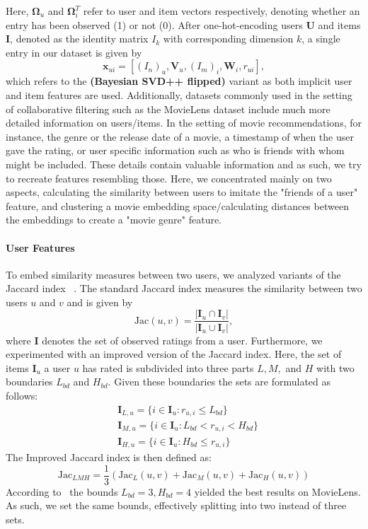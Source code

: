 \documentclass[10pt,conference,compsocconf]{IEEEtran}
\begin{document}
    Here, $\mathbf{\Omega}_u$ and $\mathbf{\Omega}^T_i$ refer to user and item vectors respectively, denoting whether an entry has been observed (1) or not (0).
    After one-hot-encoding users $\mathbf{U}$ and items $\mathbf{I}$, denoted as the identity matrix $I_k$ with corresponding dimension $k$, a single entry in our dataset is given by
    $$\mathbf{x}_{ui} = [(I_n)_u,\mathbf{V}_u,(I_m)_i,\mathbf{W}_i, r_{ui}],$$
    which refers to the \textbf{(Bayesian SVD++ flipped)} variant as both implicit user and item features are used.
    Additionally, datasets commonly used in the setting of collaborative filtering such as the MovieLens dataset include much more detailed information on users/items.
    In the setting of movie recommendations, for instance, the genre or the release date of a movie, a timestamp of when the user gave the rating, or user specific information such as who is friends with whom might be included.
    These details contain valuable information and as such, we try to recreate features resembling those.
    Here, we concentrated mainly on two aspects, calculating the similarity between users to imitate the "friends of a user" feature, and clustering a movie embedding space/calculating distances between the embeddings to create a "movie genre" feature.

    \paragraph{User Features}
    To embed similarity measures between two users, we analyzed variants of the Jaccard index%
    ~\cite{lee_improving_2017}.
    The standard Jaccard index measures the similarity between two users $u$ and $v$ and is given by
    $$\text{Jac}(u,v)=\frac{|\mathbf{I}_u \cap \mathbf{I}_v|}{|\mathbf{I}_u \cup \mathbf{I}_v|},$$
    where $\mathbf{I}$ denotes the set of observed ratings from a user.
    Furthermore, we experimented with an improved version of the Jaccard index.
    Here, the set of items $\mathbf{I}_u$ a user $u$ has rated is subdivided into three parts $L,M,$ and $H$ with two boundaries $L_{bd}$ and $H_{bd}$.
    Given these boundaries the sets are formulated as follows:
    \begin{align*}
        &\mathbf{I}_{L,u}=\{i \in \mathbf{I}_u : r_{u,i} \leq L_{bd}\}\\
        &\mathbf{I}_{M,u}=\{i \in \mathbf{I}_u : L_{bd} < r_{u,i} < H_{bd}\}\\
        &\mathbf{I}_{H,u}=\{i \in \mathbf{I}_u : H_{bd} \leq r_{u,i}\}
    \end{align*}
    The Improved Jaccard index is then defined as:
    $$\text{Jac}_{LMH}=\frac{1}{3}(\text{Jac}_L(u,v) + \text{Jac}_M(u,v) + \text{Jac}_H(u,v))$$
    According to~\cite{lee_improving_2017} the bounds $L_{bd} = 3, H_{bd}=4$ yielded the best results on MovieLens.
    As such, we set the same bounds, effectively splitting into two instead of three sets.
\end{document}
